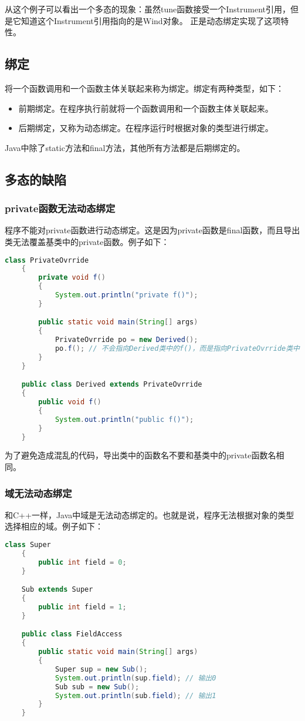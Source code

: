 \documentclass[a4paper,left=2.5cm,right=2.5cm,11pt]{article}
\begin{document}
	从这个例子可以看出一个多态的现象：虽然tune函数接受一个Instrument引用，但是它知道这个Instrument引用指向的是Wind对象。
	正是动态绑定实现了这项特性。

\subsection{绑定}
	将一个函数调用和一个函数主体关联起来称为绑定。绑定有两种类型，如下：
	\begin{itemize}
		\item 前期绑定。在程序执行前就将一个函数调用和一个函数主体关联起来。
		\item 后期绑定，又称为动态绑定。在程序运行时根据对象的类型进行绑定。
	\end{itemize}

	Java中除了static方法和final方法，其他所有方法都是后期绑定的。

\subsection{多态的缺陷}
\subsubsection{private函数无法动态绑定}
	程序不能对private函数进行动态绑定。这是因为private函数是final函数，而且导出类无法覆盖基类中的private函数。例子如下：
	\begin{lstlisting}[language = Java]
	class PrivateOvrride
	{
		private void f()
		{
			System.out.println("private f()");
		}

		public static void main(String[] args)
		{
			PrivateOvrride po = new Derived();
			po.f(); // 不会指向Derived类中的f()，而是指向PrivateOvrride类中的f()
		}
	}

	public class Derived extends PrivateOvrride
	{
		public void f()
		{
			System.out.println("public f()");
		}
	}
	\end{lstlisting}

	为了避免造成混乱的代码，导出类中的函数名不要和基类中的private函数名相同。

\subsubsection{域无法动态绑定}
	和C++一样，Java中域是无法动态绑定的。也就是说，程序无法根据对象的类型选择相应的域。例子如下：
	\begin{lstlisting}[language = Java]
	class Super
	{
		public int field = 0;
	}

	Sub extends Super
	{
		public int field = 1;
	}

	public class FieldAccess
	{
		public static void main(String[] args)
		{
			Super sup = new Sub();
			System.out.println(sup.field); // 输出0
			Sub sub = new Sub();
			System.out.println(sub.field); // 输出1
		}
	}
	\end{lstlisting}
\end{document}
